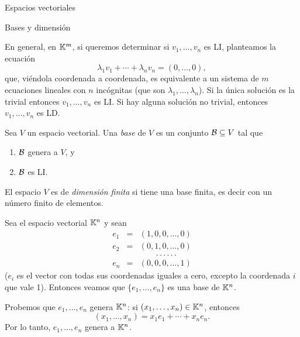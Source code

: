 \begin{chapter}{Espacios vectoriales}
\begin{section}{Bases y dimensi\'on}
\begin{observacion*}
    En  general,  en $\mathbb K^m$, si queremos determinar si  $v_1,\ldots,v_n$ es LI, planteamos la ecuación  
    \begin{equation*}
    \lambda_1v_1+\cdots+\lambda_nv_n=(0,\ldots,0),
    \end{equation*}
    que, viéndola coordenada a coordenada, es equivalente a un sistema de $m$ ecuaciones lineales con  $n$ incógnitas (que son $\lambda_1,\ldots,\lambda_n$). Si  la única solución es la trivial entonces $v_1,\ldots,v_n$ es LI. Si hay alguna solución no trivial, entonces $v_1,\ldots,v_n$ es LD. 
\end{observacion*}
 
 \begin{definicion}\label{def-base}
     Sea $V$ un espacio vectorial. Una \textit{base} de $V$ es un conjunto $\mathcal{B} \subseteq V$ tal que
     \begin{enumerate}
         \item\label{it.genera} $\mathcal{B}$ genera a $V$, y
         \item\label{it.li} $\mathcal{B}$ es LI.
     \end{enumerate}
      El espacio $V$ es de \textit{dimensión finita} si tiene una base finita,  es decir con  un número finito de elementos.
 \end{definicion}



\begin{ejemplo*} Sea el espacio vectorial $\mathbb K^n$ y sean
    \begin{equation*}
    \begin{array}{rcl}
    e_1 &=& (1,0,0,\ldots,0) \\
    e_2 &=& (0,1,0,\ldots,0) \\
    &&\qquad.\,.\,.\,.\,.\,.\,\\ 
    e_n&=& (0,0,0,\ldots,1)
    \end{array}
    \end{equation*}
    ($e_i$ es el vector con todas sus coordenadas iguales a cero,  excepto  la coordenada $i$ que vale 1). Entonces veamos que  $\{e_1,\ldots,e_n\}$ es una base de $\mathbb K^n$.
    
    Probemos que $e_1,\ldots,e_n$ genera  $\mathbb K^n$: si $(x_1,\ldots,x_n) \in \mathbb K^n$,  entonces
        $$
        (x_1,\ldots,x_n) = x_1e_1+\cdots+x_ne_n.
        $$
        Por lo tanto, $e_1,\ldots,e_n$ genera a  $\mathbb K^n$.
        

\end{ejemplo*}
\end{section}
\end{chapter}
